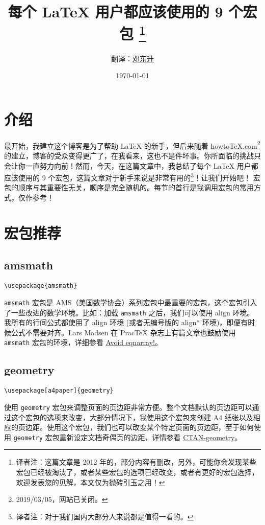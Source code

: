 \documentclass[cn]{elegantpaper}
\title{每个 \LaTeX{} 用户都应该使用的 9 个宏包 \thanks{译者注：这篇文章是 2012 年的，部分内容有删改，另外，可能你会发现某些宏包已经被淘汰了，或者某些宏包的选项已经改变，或者有更好的宏包选择，欢迎发表您的见解，本文仅为抛砖引玉之用！ }}
\author{翻译：\href{https://ddswhu.me/}{邓东升}}
\institute{\href{https://elegantlatex.org/}{Elegant\LaTeX{} 项目组}}
\date{\today}
\begin{document}
\maketitle

\section{介绍}

最开始，我建立这个博客是为了帮助 \LaTeX{} 的新手，但后来随着 \href{http://www.howtotex.com/}{howto\TeX{}.com}\footnote{2019/03/05，网站已关闭。} 的建立，博客的受众变得更广了，在我看来，这也不是件坏事。你所面临的挑战只会让你一直努力向前！然而，今天，在这篇文章中，我总结了每个 \LaTeX{} 用户都应该使用的 9 个宏包，这篇文章对于新手来说是非常有用的\footnote{译者注：对于我们国内大部分人来说都是值得一看的。}！让我们开始吧！ 宏包的顺序与其重要性无关，顺序是完全随机的。每节的首行是我调用宏包的常用方式，仅作参考！

\section{宏包推荐}

\subsection{amsmath}

\begin{lstlisting}
\usepackage{amsmath}
\end{lstlisting}

\lstinline{amsmath} 宏包是 AMS（美国数学协会）系列宏包中最重要的宏包，这个宏包引入了一些改进的数学环境。比如：加载 \lstinline{amsmath} 之后，我们可以使用 align 环境。我所有的行间公式都使用了 align 环境 (或者无编号版的 align* 环境)，即便有时候公式不需要对齐。Lars Madsen 在 Prac\TeX{} 杂志上有篇文章也鼓励使用 \lstinline{amsmath} 宏包的环境，详细参看 \href{http://www.tug.org/pracjourn/2006-4/madsen/madsen.pdf}{Avoid eqnarray!}。


\subsection{geometry}

\begin{lstlisting}
\usepackage[a4paper]{geometry}
\end{lstlisting}

使用 \lstinline{geometry} 宏包来调整页面的页边距非常方便。整个文档默认的页边距可以通过这个宏包的选项来改变，大部分情况下，我使用这个宏包来创建 A4 纸张以及相应的页边距。使用这个宏包，我们也可以改变某个特定页面的页边距，至于如何使用 \lstinline{geometry} 宏包重新设定文档奇偶页的边距，详情参看 \href{https://ctan.org/pkg/geometry}{CTAN-geometry}。
\end{document}
